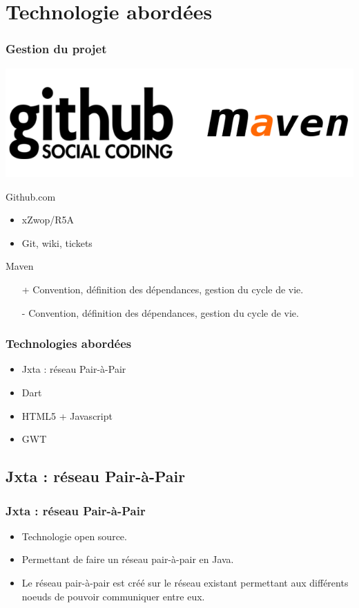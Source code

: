 \section{Technologie abordées}
  \begin{frame}
    \frametitle{Gestion du projet}
    \center
		\includegraphics[scale=.2]{github-maven.png}
    \begin{block}{Github.com}
      \begin{itemize}
        \item xZwop/R5A
        \item Git, wiki, tickets
      \end{itemize}
    \end{block}

    \begin{block}{Maven}
      \begin{itemize}
        \item[+] Convention, définition des dépendances, gestion du cycle de
          vie.
        \item[-] Convention, définition des dépendances, gestion du cycle de
          vie.
      \end{itemize}
    \end{block}
  \end{frame}

  \begin{frame}
    \frametitle{Technologies abordées}
    \begin{itemize}
      \item Jxta : réseau Pair-à-Pair
      \item Dart
      \item HTML5 + Javascript
      \item GWT
    \end{itemize}
  \end{frame}

  \subsection*{Jxta : réseau Pair-à-Pair}
    \begin{frame}
      \frametitle{Jxta : réseau Pair-à-Pair}
      \begin{itemize}
        \item Technologie open source.
        \item Permettant de faire un réseau	pair-à-pair en Java. 
        \item Le  réseau pair-à-pair est créé sur le réseau existant permettant aux différents noeuds de pouvoir communiquer entre eux.\\
      \end{itemize}
    \end{frame}
    
